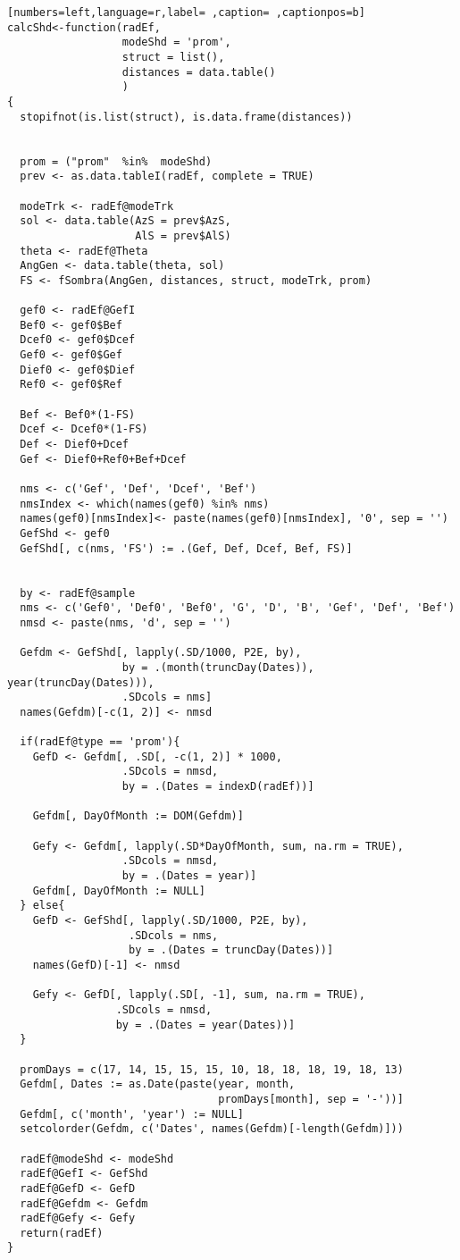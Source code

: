 \begin{lstlisting}[numbers=left,language=r,label= ,caption= ,captionpos=b]
calcShd<-function(radEf,
                  modeShd = 'prom',      
                  struct = list(), 
                  distances = data.table() 
                  )
{
  stopifnot(is.list(struct), is.data.frame(distances))

  
  prom = ("prom"  %in%  modeShd)
  prev <- as.data.tableI(radEf, complete = TRUE)
  
  modeTrk <- radEf@modeTrk
  sol <- data.table(AzS = prev$AzS,
                    AlS = prev$AlS)
  theta <- radEf@Theta
  AngGen <- data.table(theta, sol)
  FS <- fSombra(AngGen, distances, struct, modeTrk, prom)
  
  gef0 <- radEf@GefI
  Bef0 <- gef0$Bef
  Dcef0 <- gef0$Dcef
  Gef0 <- gef0$Gef
  Dief0 <- gef0$Dief
  Ref0 <- gef0$Ref
  
  Bef <- Bef0*(1-FS)
  Dcef <- Dcef0*(1-FS)
  Def <- Dief0+Dcef
  Gef <- Dief0+Ref0+Bef+Dcef 
  
  nms <- c('Gef', 'Def', 'Dcef', 'Bef')
  nmsIndex <- which(names(gef0) %in% nms)
  names(gef0)[nmsIndex]<- paste(names(gef0)[nmsIndex], '0', sep = '')
  GefShd <- gef0
  GefShd[, c(nms, 'FS') := .(Gef, Def, Dcef, Bef, FS)]

  
  by <- radEf@sample
  nms <- c('Gef0', 'Def0', 'Bef0', 'G', 'D', 'B', 'Gef', 'Def', 'Bef')
  nmsd <- paste(nms, 'd', sep = '')

  Gefdm <- GefShd[, lapply(.SD/1000, P2E, by),
                  by = .(month(truncDay(Dates)), year(truncDay(Dates))),
                  .SDcols = nms]
  names(Gefdm)[-c(1, 2)] <- nmsd

  if(radEf@type == 'prom'){
    GefD <- Gefdm[, .SD[, -c(1, 2)] * 1000,
                  .SDcols = nmsd,
                  by = .(Dates = indexD(radEf))] 
    
    Gefdm[, DayOfMonth := DOM(Gefdm)]
    
    Gefy <- Gefdm[, lapply(.SD*DayOfMonth, sum, na.rm = TRUE),
                  .SDcols = nmsd,
                  by = .(Dates = year)]
    Gefdm[, DayOfMonth := NULL]
  } else{    
    GefD <- GefShd[, lapply(.SD/1000, P2E, by),
                   .SDcols = nms,
                   by = .(Dates = truncDay(Dates))]
    names(GefD)[-1] <- nmsd
    
    Gefy <- GefD[, lapply(.SD[, -1], sum, na.rm = TRUE),
                 .SDcols = nmsd,
                 by = .(Dates = year(Dates))]
  }

  promDays = c(17, 14, 15, 15, 15, 10, 18, 18, 18, 19, 18, 13)
  Gefdm[, Dates := as.Date(paste(year, month,
                                 promDays[month], sep = '-'))]
  Gefdm[, c('month', 'year') := NULL]
  setcolorder(Gefdm, c('Dates', names(Gefdm)[-length(Gefdm)]))

  radEf@modeShd <- modeShd
  radEf@GefI <- GefShd
  radEf@GefD <- GefD
  radEf@Gefdm <- Gefdm
  radEf@Gefy <- Gefy
  return(radEf)
}
\end{lstlisting}
